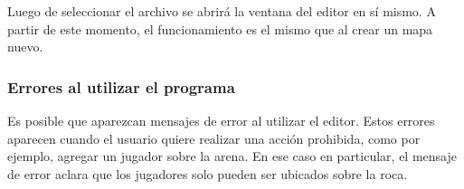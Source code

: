 \documentclass[titlepage,a4paper,12pt]{article}
\begin{document}
Luego de seleccionar el archivo se abrirá la ventana del editor en sí mismo. A partir de este momento, el funcionamiento es el mismo que al crear un mapa nuevo.\\

\subsubsection{Errores al utilizar el programa}

Es posible que aparezcan mensajes de error al utilizar el editor. Estos errores aparecen cuando el usuario quiere realizar una acción prohibida, como por ejemplo, agregar un jugador sobre la arena. En ese caso en particular, el mensaje de error aclara que los jugadores solo pueden ser ubicados sobre la roca.
\end{document}
